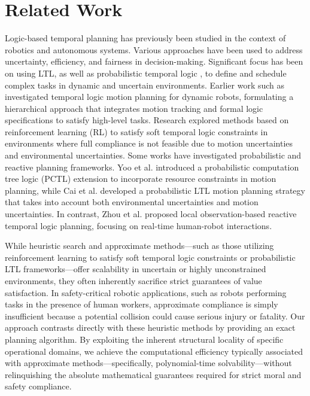 \documentclass[a4paper,fleqn]{cas-dc}
\begin{document}
\section{Related Work}\label{related}

Logic-based temporal planning has previously been studied in the context of robotics and autonomous systems. Various approaches have been used to address uncertainty, efficiency, and fairness in decision-making. Significant focus has been on using LTL, as well as probabilistic temporal logic \cite{konur2011realtimeprobabilistictemporallogics}, to define and schedule complex tasks in dynamic and uncertain environments. 
Earlier work such as \cite{fainekos2009temporal} investigated temporal logic motion planning for dynamic robots, formulating a hierarchical approach that integrates motion tracking and formal logic specifications to satisfy high-level tasks. Research \cite{cai2024reinforcement} explored methods based on reinforcement learning (RL) to satisfy soft temporal logic constraints in environments where full compliance is not feasible due to motion uncertainties and environmental uncertainties.
Some works have investigated probabilistic and reactive planning frameworks. Yoo et al. \cite{yoo2013probabilistic} introduced a probabilistic computation tree logic (PCTL) extension to incorporate resource constraints in motion planning, while Cai et al. \cite{cai2021probabilistic} developed a probabilistic LTL motion planning strategy that takes into account both environmental uncertainties and motion uncertainties. In contrast, Zhou et al. \cite{kan2024local} proposed local observation-based reactive temporal logic planning, focusing on real-time human-robot interactions.

While heuristic search and approximate methods—such as those utilizing reinforcement learning to satisfy soft temporal logic constraints or probabilistic LTL frameworks—offer scalability in uncertain or highly unconstrained environments, they often inherently sacrifice strict guarantees of value satisfaction. In safety-critical robotic applications, such as robots performing tasks in the presence of human workers, approximate compliance is simply insufficient because a potential collision could cause serious injury or fatality. Our approach contrasts directly with these heuristic methods by providing an exact planning algorithm. By exploiting the inherent structural locality of specific operational domains, we achieve the computational efficiency typically associated with approximate methods—specifically, polynomial-time solvability—without relinquishing the absolute mathematical guarantees required for strict moral and safety compliance.
\end{document}
